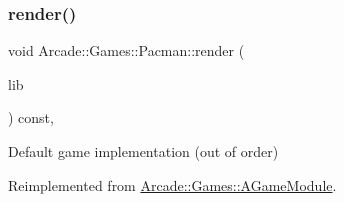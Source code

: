 \subsubsection{\texorpdfstring{render()}{render()}}
{\footnotesize\ttfamily void Arcade\+::\+Games\+::\+Pacman\+::render (\begin{DoxyParamCaption}\item[{\mbox{\hyperlink{classArcade_1_1Display_1_1IDisplayModule}{Arcade\+::\+Display\+::\+I\+Display\+Module}} \&}]{lib }\end{DoxyParamCaption}) const\hspace{0.3cm}{\ttfamily [final]}, {\ttfamily [virtual]}}

Default game implementation (out of order) 

Reimplemented from \mbox{\hyperlink{classArcade_1_1Games_1_1AGameModule_a5897780d42d5faba3287c29b87f2b498}{Arcade\+::\+Games\+::\+A\+Game\+Module}}.

